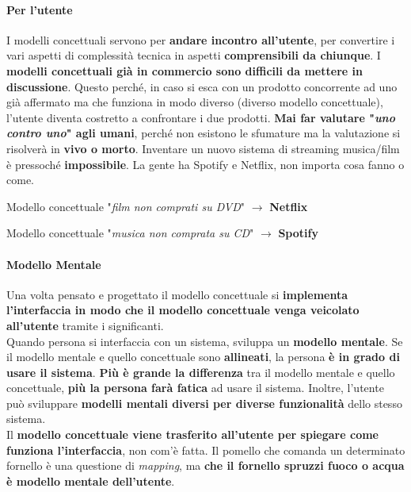 \documentclass[10pt]{article}
\begin{document}
\paragraph{Per l'utente} I modelli concettuali servono per \textbf{andare incontro all'utente}, per convertire i vari aspetti di complessità tecnica in aspetti \textbf{comprensibili da chiunque}. I \textbf{modelli concettuali già in commercio sono difficili da mettere in discussione}. Questo perché, in caso si esca con un prodotto concorrente ad uno già affermato ma che funziona in modo diverso (diverso modello concettuale), l'utente diventa costretto a confrontare i due prodotti. \textbf{Mai far valutare "\textit{uno contro uno}" agli umani}, perché non esistono le sfumature ma la valutazione si risolverà in \textbf{vivo o morto}. Inventare un nuovo sistema di streaming musica/film è pressoché \textbf{impossibile}. La gente ha Spotify e Netflix, non importa cosa fanno o come.

Modello concettuale "\textit{film non comprati su DVD}" $\rightarrow$ \textbf{Netflix}

Modello concettuale "\textit{musica non comprata su CD}" $\rightarrow$ \textbf{Spotify}

\paragraph{Modello Mentale} Una volta pensato e progettato il modello concettuale si \textbf{implementa l'interfaccia in modo che il modello concettuale venga veicolato all'utente} tramite i significanti.\\
Quando persona si interfaccia con un sistema, sviluppa un \textbf{modello mentale}. Se il modello mentale e quello concettuale sono \textbf{allineati}, la persona \textbf{è in grado di usare il sistema}. \textbf{Più è grande la differenza} tra il modello mentale e  quello concettuale, \textbf{più la persona farà fatica} ad usare il sistema. Inoltre, l'utente può sviluppare \textbf{modelli mentali diversi per diverse funzionalità} dello stesso sistema.\\
Il \textbf{modello concettuale viene trasferito all'utente per spiegare come funziona l'interfaccia}, non com'è fatta. Il pomello che comanda un determinato fornello è una questione di \textit{mapping}, ma \textbf{che il fornello spruzzi fuoco o acqua è modello mentale dell'utente}.
\end{document}
